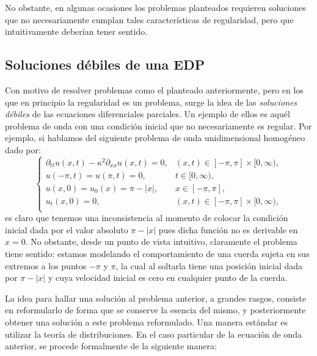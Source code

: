 \documentclass[letterpaper,twoside,12pt]{book}
\newcommand{\1}{\mathds{1}}
\newcommand{\abs}[1]{\left\lvert #1 \right\rvert}
\theoremstyle{definition}
\theoremstyle{definition}
\theoremstyle{remark}
\theoremstyle{definition}
\theoremstyle{definition}
\theoremstyle{definition}
\theoremstyle{definition}
\theoremstyle{definition}
\begin{document}
No obstante, en algunas ocasiones los problemas planteados requieren soluciones que no necesariamente cumplan tales características de regularidad, pero que intuitivamente deberían tener sentido.

\subsection{Soluciones débiles de una EDP}

Con motivo de resolver problemas como el planteado anteriormente, pero en los que en principio la regularidad es un problema, surge la idea de las \textit{soluciones débiles} de las ecuaciones diferenciales parciales. Un ejemplo de ellos es aquél problema de onda con una condición inicial que no necesariamente es regular. Por ejemplo, si hablamos del siguiente problema de onda unidimensional homogéneo dado por:
\begin{equation}\label{wave_eq_sobolev}
    \begin{cases}
        \partial_{tt}u(x,t)-\kappa^2\partial_{xx}u(x,t)=0, & (x,t)\in [-\pi,\pi]\times[0,\infty),\\
        u(-\pi,t)=u(\pi,t)=0, & t\in [0,\infty),\\
        u(x,0)=u_0(x)=\pi-\abs{x}, & x\in [-\pi,\pi],\\
        u_t(x,0)=0, & (x,t) \in [-\pi,\pi]\times[0,\infty),\\
    \end{cases}
\end{equation}
es claro que tenemos una inconsistencia al momento de colocar la condición inicial dada por el valor absoluto $\pi-|x|$ pues dicha función no es derivable en $x=0$. No obstante, desde un punto de vista intuitivo, claramente el problema tiene sentido: estamos modelando el comportamiento de una cuerda sujeta en sus extremos a los puntos $-\pi$ y $\pi$, la cual al soltarla tiene una posición inicial dada por $\pi-|x|$ y cuya velocidad inicial es cero en cualquier punto de la cuerda.

La idea para hallar una solución al problema anterior, a grandes rasgos, consiste en reformularlo de forma que se conserve la esencia del mismo, y posteriormente obtener una solución a este problema reformulado. Una manera estándar es utilizar la teoría de distribuciones. En el caso particular de la ecuación de onda anterior, se procede formalmente de la siguiente manera:
\end{document}
